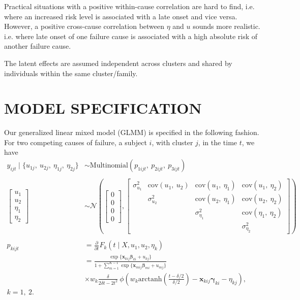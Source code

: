 Practical situations with a positive within-cause correlation are hard
to find, i.e. where an increased risk level is associated with a late
onset and vice versa. However, a positive cross-cause correlation
between \(\eta\) and \(u\) sounds more realistic. i.e. where late onset
of one failure cause is associated with a high absolute risk of another
failure cause.

The latent effects are assumed independent across clusters and shared by
individuals within the same cluster/family.

\section{MODEL SPECIFICATION}
\label{cap:modelitself}

Our generalized linear mixed model (GLMM) is specified in the following
fashion. For two competing causes of failure, a subject \(i\), with
cluster \(j\), in the time \(t\), we have
\begin{align}
  y_{i j t} \mid \{u_{1j},~u_{2j},~\eta_{1j},~\eta_{2j}\}&\sim
  \text{Multinomial}(p_{1ijt},~p_{2ijt},~p_{3ijt})\nonumber\\
  \nonumber\\
  \begin{bmatrix} u_{1}\\u_{2}\\\eta_{1}\\\eta_{2} \end{bmatrix}&\sim
  \mathcal{N} \left(\begin{bmatrix} 0\\0\\0\\0\end{bmatrix},
  \begin{bmatrix}
    \sigma_{u_{1}}^{2}&
    \text{cov}(u_{1},~u_{2})&
    \text{cov}(u_{1},~\eta_{1})&\text{cov}(u_{1},~\eta_{2})\\
    &\sigma_{u_{2}}^{2}&
    \text{cov}(u_{2},~\eta_{1})&\text{cov}(u_{2},~\eta_{2})\\
    &&\sigma_{\eta_{1}}^{2}&\text{cov}(\eta_{1},~\eta_{2})\\
    &&&\sigma_{\eta_{2}}^{2}
  \end{bmatrix}\right)\nonumber\\
  \nonumber\\
  p_{kijt} &=
  \frac{\partial}{\partial t}F_{k} (t \mid X, u_{1}, u_{2}, \eta_{k})
  \nonumber\\
  &= \frac{\exp\{\bm{x}_{kij}\bm{\beta}_{ki} + u_{kj}\}}{
    1 + \sum_{m=1}^{K-1}\exp\{\bm{x}_{mij}\bm{\beta}_{mi} + u_{mj}\}}
  \label{eq:model}\\
  &\times w_{k}\frac{\delta}{2\delta t - 2t^{2}}~
  \phi\left(
    w_{k}
    \text{arctanh}\left(\frac{t-\delta/2}{\delta/2}\right)
    - \bm{x}_{kij}\bm{\gamma}_{ki} - \eta_{kj}
    \right),\nonumber\\ k = 1,~2.\nonumber
\end{align}

